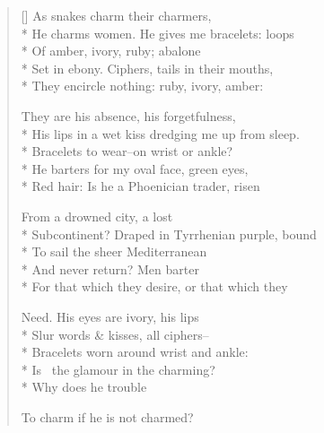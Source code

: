 \label{ch:snake_charmer}
\settowidth{\versewidth}{His lips in a wet kiss dredging me up from sleep.}
\begin{verse}[\versewidth]
As snakes charm their charmers,\\*
He charms women. He gives me bracelets: loops\\*
Of amber, ivory, ruby; abalone\\*
Set in ebony. Ciphers, tails in their mouths,\\*
They encircle nothing: ruby, ivory, amber:

They are his absence, his forgetfulness,\\*
His lips in a wet kiss dredging me up from sleep.\\*
Bracelets to wear--on wrist or ankle?\\*
He barters for my oval face, green eyes,\\*
Red hair: Is he a Phoenician trader, risen

From a drowned city, a lost\\*
Subcontinent? Draped in Tyrrhenian purple, bound\\*
To sail the sheer Mediterranean\\*
And never return? Men barter\\*
For that which they desire, or that which they

Need. His eyes are ivory, his lips\\*
Slur words \& kisses, all ciphers--\\*
Bracelets worn around wrist and ankle:\\*
Is  the glamour in the charming?\\*
Why does he trouble

To charm if he is not charmed?
\end{verse}
